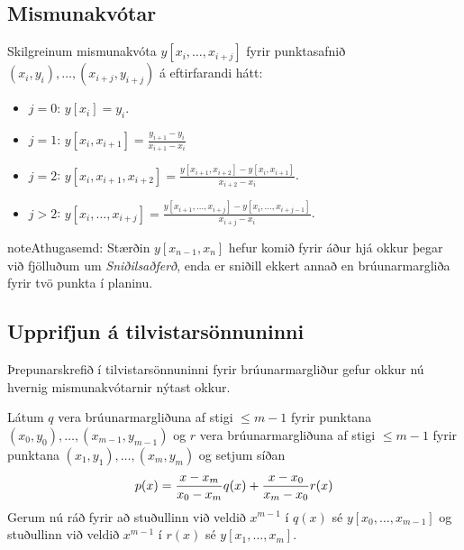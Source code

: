\documentclass[letterpaper,10pt,icelandic]{sphinxmanual}
\begin{document}
\subsection{Mismunakvótar}
\label{kafli03:mismunakvotar}\label{kafli03:index-9}
Skilgreinum mismunakvóta \(y[x_i,\ldots,x_{i+j}]\) fyrir
punktasafnið \((x_i,y_i),\ldots,(x_{i+j},y_{i+j})\) á eftirfarandi
hátt:
\begin{itemize}
\item {} 
\(j=0\): \(y[x_i] = y_i\).

\item {} 
\(j=1\): \(y[x_i,x_{i+1}] = \frac{y_{i+1}-y_i}{x_{i+1}-x_i}\)

\item {} 
\(j=2\):
\(y[x_i,x_{i+1},x_{i+2}] = \frac{y[x_{i+1},x_{i+2}] - y[x_i,x_{i+1}]}{x_{i+2}-x_i}\).

\item {} 
\(j>2\):
\(y[x_i,\ldots,x_{i+j}] = \frac{y[x_{i+1},\ldots,x_{i+j}] - y[x_i,\ldots,x_{i+j-1}]}{x_{i+j}-x_i}\).

\end{itemize}

\begin{notice}{note}{Athugasemd:}
Stærðin \(y[x_{n-1},x_n]\) hefur komið fyrir áður
hjá okkur þegar við fjölluðum um \emph{Sniðilsaðferð}, enda er sniðill
ekkert annað en brúunarmargliða fyrir tvö punkta í planinu.
\end{notice}


\subsection{Upprifjun á tilvistarsönnuninni}
\label{kafli03:upprifjun-a-tilvistarsonnuninni}
Þrepunarskrefið í tilvistarsönnuninni
fyrir brúunarmargliður gefur okkur nú hvernig mismunakvótarnir nýtast okkur.

Látum \(q\) vera brúunarmargliðuna af stigi \(\leq m-1\) fyrir
punktana \((x_0,y_0), \ldots,
(x_{m-1},y_{m-1})\) og \(r\) vera brúunarmargliðuna af stigi
\(\leq m-1\) fyrir punktana \((x_1,y_1), \ldots, (x_m,y_m)\) og
setjum síðan
\begin{gather}
\begin{split}p(x) = \frac{x-x_m}{x_0-x_m}q(x) + \frac{x-x_0}{x_m-x_0}r(x)\end{split}\notag
\end{gather}
Gerum nú ráð fyrir að stuðullinn við veldið \(x^{m-1}\) í
\(q(x)\) sé \(y[x_0, \ldots, x_{m-1}]\) og stuðullinn við veldið
\(x^{m-1}\) í \(r(x)\) sé \(y[x_1, \ldots, x_m]\).
\end{document}
